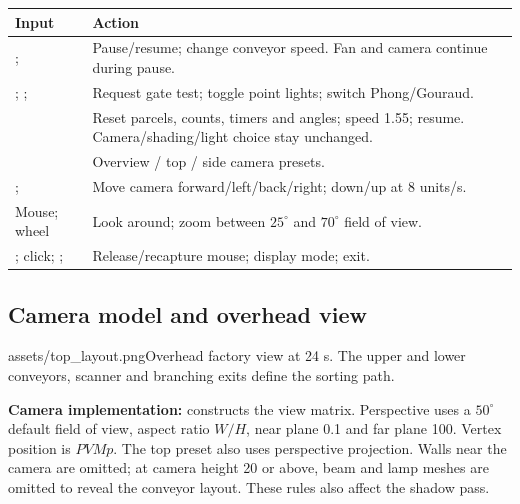 \par{\small\begin{tabularx}{\textwidth}{@{}L{35mm}Y@{}}\toprule
\textbf{Input} & \textbf{Action}\\\midrule
{}; \code{+/-} & Pause/resume; change conveyor speed. Fan and camera continue during pause.\\
; ;  & Request gate test; toggle point lights; switch Phong/Gouraud.\\
 & Reset parcels, counts, timers and angles; speed 1.55; resume. Camera/shading/light choice stay unchanged.\\
 & Overview / top / side camera presets.\\
;  & Move camera forward/left/back/right; down/up at 8 units/s.\\
Mouse; wheel & Look around; zoom between $25^\circ$ and $70^\circ$ field of view.\\
; click; ;  & Release/recapture mouse; display mode; exit.\\\bottomrule
\end{tabularx}}\par
\subsection{Camera model and overhead view}
\begin{shot}{assets/top_layout.png}{Overhead factory view at 24 s. The upper and lower conveyors, scanner and branching exits define the sorting path.}
\end{shot}
\textbf{Camera implementation:}  constructs the view matrix. Perspective uses a $50^\circ$ default field of view, aspect ratio $W/H$, near plane 0.1 and far plane 100. Vertex position is $PVMp$. The top preset also uses perspective projection. Walls near the camera are omitted; at camera height 20 or above, beam and lamp meshes are omitted to reveal the conveyor layout. These rules also affect the shadow pass.
